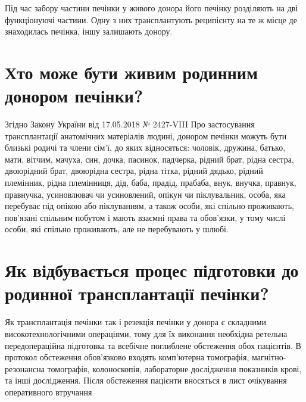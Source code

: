 Під час забору частини печінки у живого донора його печінку розділяють на дві функціонуючі частини. Одну з них трансплантують реципієнту на те ж місце де знаходилась  печінка, іншу залишають донору.


\section{Хто може бути живим родинним донором печінки?}

Згідно Закону України від 17.05.2018 № 2427-VIII Про застосування трансплантації анатомічних матеріалів людині, донором печінки можуть бути близькі родичі та члени сім’ї, до яких відносяться: чоловік, дружина, батько, мати, вітчим, мачуха, син, дочка, пасинок, падчерка, рідний брат, рідна сестра, двоюрідний брат, двоюрідна сестра, рідна тітка, рідний дядько, рідний племінник, рідна племінниця, дід, баба, прадід, прабаба, внук, внучка, правнук, правнучка, усиновлювач чи усиновлений, опікун чи піклувальник, особа, яка перебуває під опікою або піклуванням, а також особи, які спільно проживають, пов’язані спільним побутом і мають взаємні права та обов’язки, у тому числі особи, які спільно проживають, але не перебувають у шлюбі.



\section{Як відбувається процес підготовки до родинної трансплантації печінки?}

Як трансплантація печінки так і резекція печінки у донора є складними високотехнологічними операціями, тому для їх виконання необхідна ретельна передопераційна підготовка та всебічне поглиблене обстеження обох пацієнтів. В протокол обстеження обов’язково входять комп’ютерна томографія, магнітно-резонансна томографія, колоноскопія, лабораторне дослідження показників крові, та інші дослідження. Після обстеження пацієнти вносяться в лист очікування оперативного втручання
